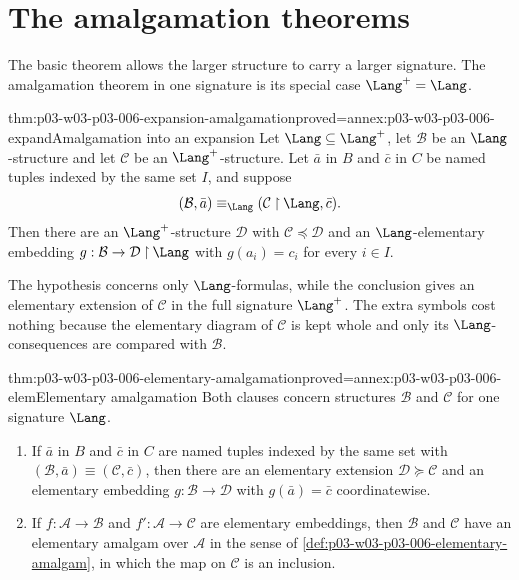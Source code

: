 \section{The amalgamation theorems}
\label{sec:p03-w03-p03-006-theorems}

The basic theorem allows the larger structure to carry a larger signature.
The amalgamation theorem in one signature is its special case
\(\Lang^+=\Lang\).

\begin{hbtheorem}{thm:p03-w03-p03-006-expansion-amalgamation}{proved=annex:p03-w03-p03-006-expand}{Amalgamation into an expansion}
Let \(\Lang\subseteq\Lang^+\), let \(\mathcal B\) be an
\(\Lang\)-structure and let \(\mathcal C\) be an \(\Lang^+\)-structure.
Let \(\bar a\) in \(B\) and \(\bar c\) in \(C\) be named tuples indexed by
the same set \(I\), and suppose
\[
 (\mathcal B,\bar a)\equiv_{\Lang}(\mathcal C\mathbin{\upharpoonright}\Lang,\bar c).
\]
Then there are an \(\Lang^+\)-structure \(\mathcal D\) with
\(\mathcal C\preccurlyeq\mathcal D\) and an \(\Lang\)-elementary embedding
\(g:\mathcal B\to\mathcal D\mathbin{\upharpoonright}\Lang\) with
\(g(a_i)=c_i\) for every \(i\in I\).
\end{hbtheorem}

The hypothesis concerns only \(\Lang\)-formulas, while the conclusion
gives an elementary extension of \(\mathcal C\) in the full signature
\(\Lang^+\).  The extra symbols cost nothing because the elementary diagram
of \(\mathcal C\) is kept whole and only its \(\Lang\)-consequences are
compared with \(\mathcal B\).

\begin{hbcorollary}{thm:p03-w03-p03-006-elementary-amalgamation}{proved=annex:p03-w03-p03-006-elem}{Elementary amalgamation}
Both clauses concern structures \(\mathcal B\) and \(\mathcal C\) for one
signature \(\Lang\).
\begin{enumerate}
  \item If \(\bar a\) in \(B\) and \(\bar c\) in \(C\) are named tuples
        indexed by the same set with
        \((\mathcal B,\bar a)\equiv(\mathcal C,\bar c)\), then there are an
        elementary extension \(\mathcal D\succcurlyeq\mathcal C\) and an
        elementary embedding \(g:\mathcal B\to\mathcal D\) with
        \(g(\bar a)=\bar c\) coordinatewise.
  \item If \(f:\mathcal A\to\mathcal B\) and \(f':\mathcal A\to\mathcal C\)
        are elementary embeddings, then \(\mathcal B\) and \(\mathcal C\)
        have an elementary amalgam over \(\mathcal A\) in the sense of
        \cref{def:p03-w03-p03-006-elementary-amalgam}, in which the map
        on \(\mathcal C\) is an inclusion.
\end{enumerate}
\end{hbcorollary}

